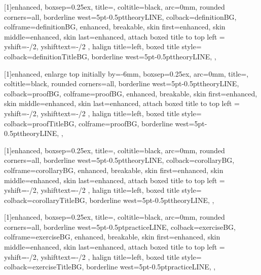 [1]{enhanced,
    boxsep=0.25ex,
    title=,
    coltitle=black,
    arc=0mm,
    rounded corners=all,
    borderline west={5pt}{-0.5pt}{theoryLINE},
    colback=definitionBG,
    colframe=definitionBG,
    enhanced,
    breakable,
    skin first=enhanced,
    skin middle=enhanced,
    skin last=enhanced,
    attach boxed title to top left ={
        yshift=-\tcboxedtitleheight/2,
        yshifttext=-\tcboxedtitleheight/2
    },
    halign title=left,
    boxed title style={
        colback=definitionTitleBG,
        borderline west={5pt}{-0.5pt}{theoryLINE},
    },
}  %

[1]{enhanced,
    enlarge top initially by=-6mm,
    boxsep=0.25ex,
    arc=0mm,
    title=,
    coltitle=black,
    rounded corners=all,
    borderline west={5pt}{-0.5pt}{theoryLINE},
    colback=proofBG,
    colframe=proofBG,
    enhanced,
    breakable,
    skin first=enhanced,
    skin middle=enhanced,
    skin last=enhanced,
    attach boxed title to top left ={
        yshift=-\tcboxedtitleheight/2,
        yshifttext=-\tcboxedtitleheight/2
    },
    halign title=left,
    boxed title style={
        colback=proofTitleBG,
        colframe=proofBG,
        borderline west={5pt}{-0.5pt}{theoryLINE},
    },
}  %

[1]{enhanced,
    boxsep=0.25ex,
    title=,
    coltitle=black,
    arc=0mm,
    rounded corners=all,
    borderline west={5pt}{-0.5pt}{theoryLINE},
    colback=corollaryBG,
    colframe=corollaryBG,
    enhanced,
    breakable,
    skin first=enhanced,
    skin middle=enhanced,
    skin last=enhanced,
    attach boxed title to top left ={
        yshift=-\tcboxedtitleheight/2,
        yshifttext=-\tcboxedtitleheight/2
    },
    halign title=left,
    boxed title style={%
        colback=corollaryTitleBG,
        borderline west={5pt}{-0.5pt}{theoryLINE},
    },
}  %

[1]{enhanced,
    boxsep=0.25ex,
    title=,
    coltitle=black,
    arc=0mm,
    rounded corners=all,
    borderline west={5pt}{-0.5pt}{practiceLINE},
    colback=exerciseBG,
    colframe=exerciseBG,
    enhanced,
    breakable,
    skin first=enhanced,
    skin middle=enhanced,
    skin last=enhanced,
    attach boxed title to top left ={
        yshift=-\tcboxedtitleheight/2,
        yshifttext=-\tcboxedtitleheight/2
    },
    halign title=left,
    boxed title style={%
        colback=exerciseTitleBG,
        borderline west={5pt}{-0.5pt}{practiceLINE},
    },
}  %

